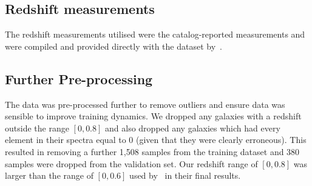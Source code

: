 \subsection{Redshift measurements}\label{subsec:redshift}
The redshift measurements utilised were the catalog-reported measurements and were compiled and provided directly with the
dataset by~\cite{astroclip}.

\subsection{Further Pre-processing}\label{subsec:pre-processing}
The data was pre-processed further to remove outliers and ensure data was sensible to improve training dynamics.
We dropped any galaxies with a redshift outside the range $[0, 0.8]$ and also dropped any galaxies which had every element
in their spectra equal to 0 (given that they were clearly erroneous).
This resulted in removing a further 1,508 samples from the training dataset and 380 samples were dropped from the
validation set.
Our redshift range of $[0, 0.8]$ was larger than the range of $[0, 0.6]$ used by~\cite{astroclip} in their final results.
